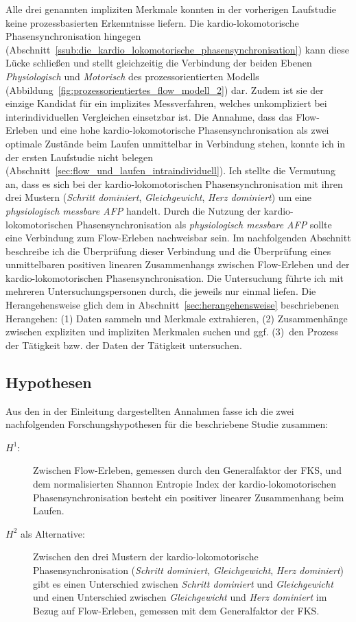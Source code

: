 Alle drei genannten impliziten Merkmale konnten in der vorherigen Laufstudie keine prozessbasierten Erkenntnisse liefern. Die kardio-lokomotorische Phasensynchronisation hingegen (Abschnitt~\ref{ssub:die_kardio_lokomotorische_phasensynchronisation}) kann diese Lücke schließen und stellt gleichzeitig die Verbindung der beiden Ebenen \emph{Physiologisch} und \emph{Motorisch} des prozessorientierten Modells (Abbildung~\ref{fig:prozessorientiertes_flow_modell_2}) dar. Zudem ist sie der einzige Kandidat für ein implizites Messverfahren, welches unkompliziert bei interindividuellen Vergleichen einsetzbar ist. Die Annahme, dass das Flow-Erleben und eine hohe kardio-lokomotorische Phasensynchronisation als zwei optimale Zustände beim Laufen unmittelbar in Verbindung stehen, konnte ich in der ersten Laufstudie nicht belegen (Abschnitt~\ref{sec:flow_und_laufen_intraindividuell}). Ich stellte die Vermutung an, dass es sich bei der kardio-lokomotorischen Phasensynchronisation mit ihren drei Mustern (\emph{Schritt dominiert}, \emph{Gleichgewicht}, \emph{Herz dominiert}) um eine \emph{physiologisch messbare \ac{AFP}} handelt. Durch die Nutzung der kardio-lokomotorischen Phasensynchronisation als \emph{physiologisch messbare \ac{AFP}} sollte eine Verbindung zum Flow-Erleben nachweisbar sein. Im nachfolgenden Abschnitt beschreibe ich die Überprüfung dieser Verbindung und die Überprüfung eines unmittelbaren positiven linearen Zusammenhangs zwischen Flow-Erleben und der kardio-lokomotorischen Phasensynchronisation. Die Untersuchung führte ich mit mehreren Untersuchungspersonen durch, die jeweils nur einmal liefen. Die Herangehensweise glich dem in Abschnitt~\ref{sec:herangehensweise} beschriebenen Herangehen: (1) Daten sammeln und Merkmale extrahieren, (2) Zusammenhänge zwischen expliziten und impliziten Merkmalen suchen und ggf. (3)~den Prozess der Tätigkeit bzw. der Daten der Tätigkeit untersuchen. 

\subsection{Hypothesen} 

\label{sub:hypothesen}

Aus den in der Einleitung dargestellten Annahmen fasse ich die zwei nachfolgenden Forschungshypothesen für die beschriebene Studie zusammen: 
\begin{description}
	\item[$H^1$:] Zwischen Flow-Erleben, gemessen durch den Generalfaktor der \ac{FKS}, und dem normalisierten Shannon Entropie Index der kardio-lokomotorischen Phasensynchronisation besteht ein positiver linearer Zusammenhang beim Laufen. 
	\item[$H^2$ als Alternative:]  Zwischen den drei Mustern der kardio-lokomotorische Phasensynchronisation (\emph{Schritt dominiert}, \emph{Gleichgewicht}, \emph{Herz dominiert}) gibt es einen Unterschied zwischen \emph{Schritt dominiert} und \emph{Gleichgewicht} und einen Unterschied zwischen \emph{Gleichgewicht} und \emph{Herz dominiert} im Bezug auf Flow-Erleben, gemessen mit dem Generalfaktor der \ac{FKS}. 
\end{description}

